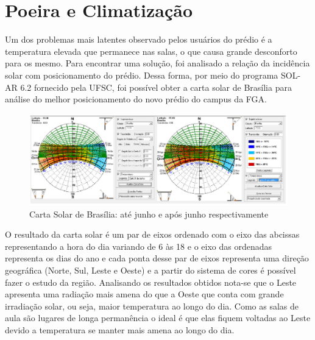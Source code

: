 \section{Poeira e Climatização}

Um dos problemas mais latentes observado pelos usuários do prédio é a temperatura elevada que permanece nas salas, o que causa grande desconforto para os mesmo. Para encontrar uma solução, foi analisado a relação da incidência solar com posicionamento do prédio. Dessa forma, por meio do programa SOL-AR 6.2 fornecido pela UFSC, foi possível obter a carta solar de Brasília para análise do melhor posicionamento do novo prédio do campus da FGA.

\begin{figure}[!ht]
  \centering
  \includegraphics[keepaspectratio=true,scale=1]{figuras/cartasolar.eps}
  \caption{Carta Solar de Brasília: até junho e após junho respectivamente}
  \label{fig:carta_solar}
\end{figure}

O resultado da carta solar é um par de eixos ordenado com o eixo das abcissas representando a hora do dia variando de 6 às 18 e o eixo das ordenadas representa os dias do ano e cada ponta desse par de eixos representa uma direção geográfica (Norte, Sul, Leste e Oeste) e a partir do sistema de cores é possível fazer o estudo da região. Analisando os resultados obtidos nota-se que o Leste apresenta uma radiação mais amena do que a Oeste que conta com grande irradiação solar, ou seja, maior temperatura ao longo do dia. Como as salas de aula são lugares de longa permanência o ideal é que elas fiquem voltadas ao Leste devido a temperatura se manter mais amena ao longo do dia.

